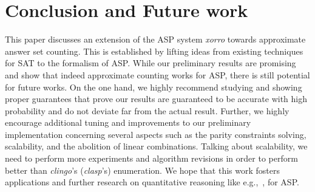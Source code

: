 \documentclass{article}
\newcommand{\sysfont}{\textit}
\newcommand{\clasp}{\sysfont{clasp}}
\newcommand{\clingo}{\sysfont{clingo}}
\newcommand{\xorro}{\sysfont{xorro}}
\begin{document}
\section{Conclusion and Future work} \label{sec:conclusion}
This paper discusses an extension of the ASP system \xorro{} towards approximate answer set counting.
This is established by lifting ideas from existing techniques for SAT to the formalism of ASP.
While our preliminary results are promising and show that
indeed approximate counting works for ASP, there is still potential for future works.
On the one hand, we highly recommend studying and showing proper guarantees that prove our results are guaranteed to be accurate with high probability and do not deviate far from the actual result.
Further, we highly encourage additional tuning and improvements to our preliminary implementation concerning several aspects such as the parity constraints solving, scalability, and the abolition of linear combinations.
Talking about scalability, we need to perform more experiments and algorithm revisions in order to perform better than \clingo{}'s (\clasp{}'s) enumeration.
We hope that this work fosters applications and further research on quantitative reasoning like e.g.,~\cite{KimmigDRCR11,TsamouraGK20}, for ASP.



\end{document}
